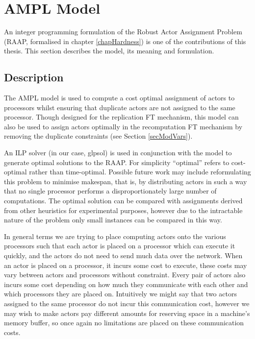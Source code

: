 \section{AMPL Model}

An integer programming formulation of the Robust Actor Assignment Problem (RAAP, formalised in chapter \ref{chapHardness}) is one of the contributions of this thesis.
This section describes the model, its meaning and formulation.

\subsection{Description}

The AMPL model is used to compute a cost optimal assignment of actors to processors whilst ensuring that duplicate actors are not assigned to the same processor.
Though designed for the replication FT mechanism, this model can also be used to assign actors optimally in the recomputation FT mechanism by removing the duplicate constraints (see Section \ref{secModVars}).

An ILP solver (in our case, glpsol) is used in conjunction with the model to generate optimal solutions to the RAAP.
For simplicity ``optimal'' refers to cost-optimal rather than time-optimal.
Possible future work may include reformulating this problem to minimise makespan, that is, by distributing actors in such a way that no single processor performs a disproportionately large number of computations.
The optimal solution can be compared with assignments derived from other heuristics for experimental purposes, however due to the intractable nature of the problem only small instances can be compared in this way.

In general terms we are trying to place computing actors onto the various processors such that each actor is placed on a processor which can execute it quickly, and the actors do not need to send much data over the network.
When an actor is placed on a processor, it incurs some cost to execute, these costs may vary between actors and processors without constraint.
Every pair of actors also incurs some cost depending on how much they communicate with each other and which processors they are placed on.
Intuitively we might say that two actors assigned to the same processor do not incur this communication cost, however we may wish to make actors pay different amounts for reserving space in a machine's memory buffer, so once again no limitations are placed on these communication costs.

